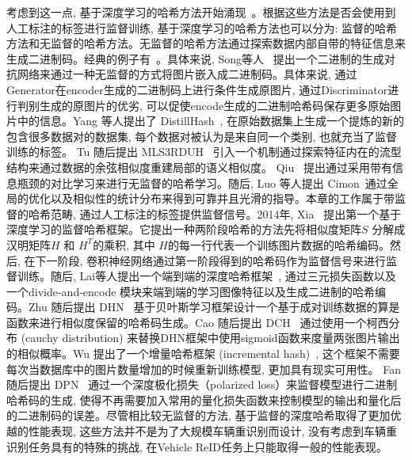 考虑到这一点, 基于深度学习的哈希方法开始涌现~\cite{cao2017hashnet, fan2020deep, li2015feature, zhu2016deep, liu2016deep}。根据这些方法是否会使用到人工标注的标签进行监督训练, 基于深度学习的哈希方法也可以分为: 监督的哈希方法和无监督的哈希方法。无监督的哈希方法通过探索数据内部自带的特征信息来生成二进制码。经典的例子有~\cite{song2018binary, yang2019distillhash, tu2020mls3rduh, qiu2021unsupervised, luo2020cimon}。具体来说, Song等人~\cite{song2018binary} 提出一个二进制的生成对抗网络来通过一种无监督的方式将图片嵌入成二进制码。具体来说, 通过Generator在encoder生成的二进制码上进行条件生成原图片, 通过Discriminator进行判别生成的原图片的优劣, 可以促使encode生成的二进制哈希码保存更多原始图片中的信息。Yang 等人提出了 DistillHash~\cite{yang2019distillhash}, 在原始数据集上生成一个提炼的新的包含很多数据对的数据集, 每个数据对被认为是来自同一个类别, 也就充当了监督训练的标签。 Tu 随后提出 MLS3RDUH~\cite{tu2020mls3rduh}  引入一个机制通过探索特征内在的流型结构来通过数据的余弦相似度重建局部的语义相似度。 Qiu ~\cite{qiu2021unsupervised}提出通过采用带有信息瓶颈的对比学习来进行无监督的哈希学习。随后, Luo 等人提出 Cimon~\cite{luo2020cimon}通过全局的优化以及相似性的统计分布来得到可靠并且光滑的指导。本章的工作属于带监督的哈希范畴, 通过人工标注的标签提供监督信号。2014年, Xia~\cite{xia2014supervised} 提出第一个基于深度学习的监督哈希框架。它提出一种两阶段哈希的方法先将相似度矩阵$S$ 分解成汉明矩阵$H$ 和 $H^T$的乘积, 其中 $H$的每一行代表一个训练图片数据的哈希编码。然后, 在下一阶段, 卷积神经网络通过第一阶段得到的哈希码作为监督信号来进行监督训练。随后, Lai等人提出一个端到端的深度哈希框架~\cite{lai2015simultaneous}, 通过三元损失函数以及一个divide-and-encode 模块来端到端的学习图像特征以及生成二进制的哈希编码。Zhu 随后提出 DHN~\cite{zhu2016deep} 基于贝叶斯学习框架设计一个基于成对训练数据的算是函数来进行相似度保留的哈希码生成。Cao 随后提出 DCH~\cite{cao2018deep} 通过使用一个柯西分布 (cauchy distribution) 来替换DHN框架中使用sigmoid函数来度量两张图片输出的相似概率。Wu 提出了一个增量哈希框架 (incremental hash)~\cite{wu2019deep}, 这个框架不需要每次当数据库中的图片数量增加的时候重新训练模型, 更加具有现实可用性。 Fan 随后提出 DPN~\cite{fan2020deep} 通过一个深度极化损失（polarized loss）来监督模型进行二进制哈希码的生成, 使得不再需要加入常用的量化损失函数来控制模型的输出和量化后的二进制码的误差。尽管相比较无监督的方法, 基于监督的深度哈希取得了更加优越的性能表现, 这些方法并不是为了大规模车辆重识别而设计, 没有考虑到车辆重识别任务具有的特殊的挑战, 在Vehicle ReID任务上只能取得一般的性能表现。 \par
